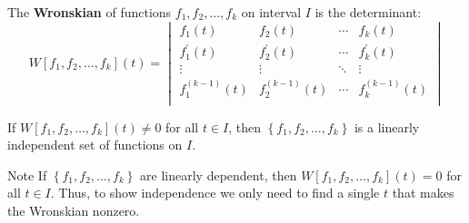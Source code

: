 \documentclass{beamer}
\begin{document}
\begin{frame}
\begin{definition}
The \textbf{Wronskian} of functions $f_1,f_2,\dots,f_k$ on interval $I$ is the determinant:
\begin{equation*}
W[f_1,f_2,\dots,f_k](t)=
\begin{vmatrix}
f_1(t)                & f_2(t)                & \cdots  & f_k(t)                \\
f_1^\prime(t)         & f_2^\prime(t)         & \cdots  & f_k^\prime(t)         \\
\vdots                & \vdots                & \ddots & \vdots                \\
f_1^{(k-1)}(t)        & f_2^{(k-1)}(t)        & \cdots  & f_k^{(k-1)}(t)        \\
\end{vmatrix}
\end{equation*}
\end{definition}\pause
\begin{theorem}
If $W[f_1,f_2,\dots,f_k](t)\neq 0$ for all $t\in I$, then $\left\{f_1,f_2,\dots,f_k\right\}$ is a linearly independent set of functions on $I$.
\end{theorem}\pause
\begin{block}{Note}
If $\left\{f_1,f_2,\dots,f_k\right\}$ are linearly dependent, then $W[f_1,f_2,\dots,f_k](t)=0$ for all $t\in I$. Thus, to show independence we only need to find a single $t$ that makes the Wronskian nonzero.
\end{block}
\end{frame}
\end{document}
